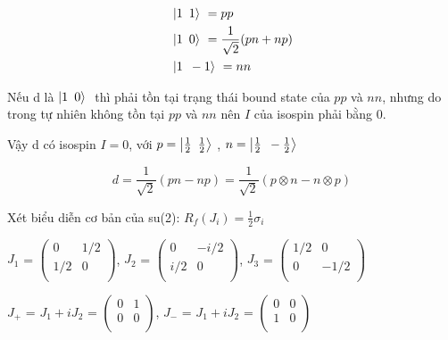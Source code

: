 \documentclass{report}
\begin{document}
	\begin{align*}
		& \left| 1 \enskip 1 \right\rangle\ = pp \\
		& \left| 1 \enskip 0 \right\rangle\ = \frac{1}{\sqrt{2}} (pn+np) \\
		& \left| 1 \enskip -1 \right\rangle\ = nn
	\end{align*}

Nếu d là \( \left| 1 \enskip 0 \right\rangle\ \) thì phải tồn tại trạng thái bound state của \(pp\) và \(nn\), nhưng do trong tự nhiên không tồn tại \(pp\) và \(nn\) nên \(I\) của isospin phải bằng 0.

Vậy d có isospin \( I = 0\), với \( p = \left| \frac{1}{2} \enskip \frac{1}{2} \right\rangle\ \), \( n = \left| \frac{1}{2} \enskip - \frac{1}{2} \right\rangle\ \)

\[ d = \frac{1}{\sqrt{2}} (pn-np) = \frac{1}{\sqrt{2}} \left( p \otimes n - n \otimes p \right) \]

Xét biểu diễn cơ bản của su(2): \( R_{f} \left( J_{i} \right) = \frac{1}{2} \sigma_{i} \)

	\begin{center}
		\( J_{1} \) = \( \begin{pmatrix}
			0 & 1/2 \\
			1/2 & 0 \\
		\end{pmatrix} \), \( J_{2} \) = \( \begin{pmatrix}
			0 & -i/2 \\
			i/2 & 0 \\
		\end{pmatrix} \), \( J_{3} \) = \(  \begin{pmatrix}
			1/2 & 0 \\
			0 & -1/2 \\
		\end{pmatrix} \)
	\end{center}
	
	\begin{center}
		\( J_{+} \) = \( J_{1} + i J_{2} \) = \( \begin{pmatrix}
			0 & 1 \\
			0 & 0 \\
		\end{pmatrix} \), \( J_{-} \) = \( J_{1} + i J_{2} \) = \( \begin{pmatrix}
			0 & 0 \\
			1 & 0 \\
		\end{pmatrix} \)
	\end{center}
\end{document}
